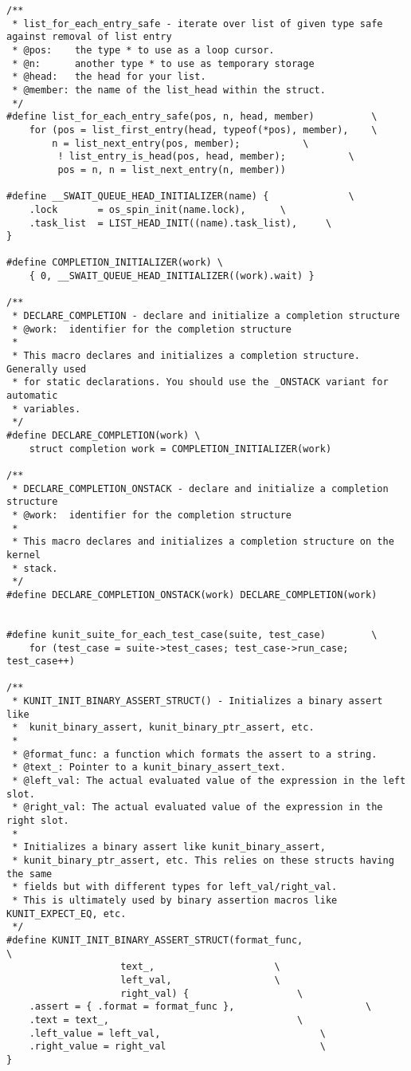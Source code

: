 \documentclass{article}
\begin{document}
\begin{lstlisting}[style=CStyle]
/**
 * list_for_each_entry_safe - iterate over list of given type safe against removal of list entry
 * @pos:	the type * to use as a loop cursor.
 * @n:		another type * to use as temporary storage
 * @head:	the head for your list.
 * @member:	the name of the list_head within the struct.
 */
#define list_for_each_entry_safe(pos, n, head, member)			\
	for (pos = list_first_entry(head, typeof(*pos), member),	\
		n = list_next_entry(pos, member);			\
	     ! list_entry_is_head(pos, head, member); 			\
	     pos = n, n = list_next_entry(n, member))

#define __SWAIT_QUEUE_HEAD_INITIALIZER(name) {				\
	.lock		= os_spin_init(name.lock),		\
	.task_list	= LIST_HEAD_INIT((name).task_list),		\
}

#define COMPLETION_INITIALIZER(work) \
	{ 0, __SWAIT_QUEUE_HEAD_INITIALIZER((work).wait) }

/**
 * DECLARE_COMPLETION - declare and initialize a completion structure
 * @work:  identifier for the completion structure
 *
 * This macro declares and initializes a completion structure. Generally used
 * for static declarations. You should use the _ONSTACK variant for automatic
 * variables.
 */
#define DECLARE_COMPLETION(work) \
	struct completion work = COMPLETION_INITIALIZER(work)

/**
 * DECLARE_COMPLETION_ONSTACK - declare and initialize a completion structure
 * @work:  identifier for the completion structure
 *
 * This macro declares and initializes a completion structure on the kernel
 * stack.
 */
#define DECLARE_COMPLETION_ONSTACK(work) DECLARE_COMPLETION(work)


#define kunit_suite_for_each_test_case(suite, test_case)		\
	for (test_case = suite->test_cases; test_case->run_case; test_case++)

/**
 * KUNIT_INIT_BINARY_ASSERT_STRUCT() - Initializes a binary assert like
 *	kunit_binary_assert, kunit_binary_ptr_assert, etc.
 *
 * @format_func: a function which formats the assert to a string.
 * @text_: Pointer to a kunit_binary_assert_text.
 * @left_val: The actual evaluated value of the expression in the left slot.
 * @right_val: The actual evaluated value of the expression in the right slot.
 *
 * Initializes a binary assert like kunit_binary_assert,
 * kunit_binary_ptr_assert, etc. This relies on these structs having the same
 * fields but with different types for left_val/right_val.
 * This is ultimately used by binary assertion macros like KUNIT_EXPECT_EQ, etc.
 */
#define KUNIT_INIT_BINARY_ASSERT_STRUCT(format_func,			       \
					text_,				       \
					left_val,			       \
					right_val) {			       \
	.assert = { .format = format_func },				       \
	.text = text_,							       \
	.left_value = left_val,						       \
	.right_value = right_val					       \
}


\end{lstlisting}
\end{document}
